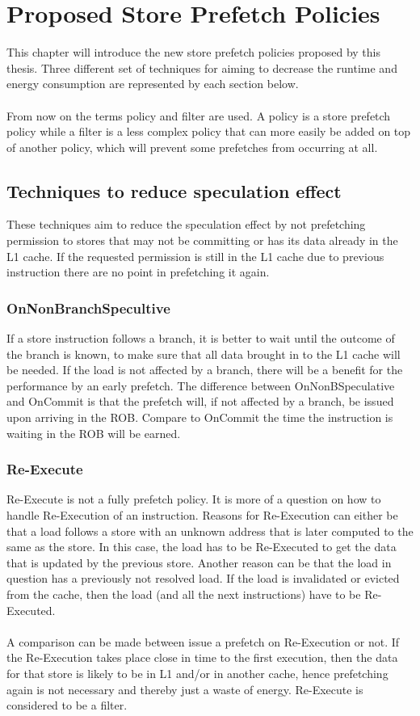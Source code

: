 \chapter{Proposed Store Prefetch Policies}
\label{chap:ProposedPrefetchPolicies}
This chapter will introduce the new store prefetch policies proposed by this thesis. Three different set of techniques for aiming to decrease the runtime and energy consumption are represented by each section below.
\\ \\
From now on the terms policy and filter are used. A policy is a store prefetch policy while a filter is a less complex policy that can more easily be added on top of another policy, which will prevent some prefetches from occurring at all.
\section{Techniques to reduce speculation effect} 
 These techniques aim to reduce the speculation effect by not prefetching permission
to stores that may not be committing or has its data already in the L1 cache. If the
requested permission is still in the L1 cache due to previous instruction there are no
point in prefetching it again.
\subsection{OnNonBranchSpecultive}
If a store instruction follows a branch, it is better to wait until the outcome of the branch is known, to make sure that all data brought in to the L1
cache will be needed. If the load is not affected by a branch, there will be a benefit
for the performance by an early prefetch. The difference between OnNonBSpeculative and OnCommit
is that the prefetch will, if not affected by a branch, be issued upon arriving in the ROB. Compare to OnCommit the time the instruction is waiting in
the ROB will be earned.
\subsection{Re-Execute}
Re-Execute is not a fully prefetch policy. It is more of a question on how to handle Re-Execution of an instruction. 
 Reasons for Re-Execution can
either be that a load follows a store with an unknown address that is later computed to
the same as the store. In this case, the load has to be Re-Executed to get the data that
is updated by the previous store. Another reason can be that the load in question has
a previously not resolved load. If the load is invalidated or evicted from the cache,
then the load (and all the next instructions) have to be Re-Executed.
\\ \\
A comparison can be made between issue a prefetch on Re-Execution or not. If the Re-Execution takes place close in time to the first execution, then the data
for that store is likely to be in L1 and/or in another cache, hence prefetching again
is not necessary and thereby just a waste of energy. Re-Execute is considered to be a filter.

